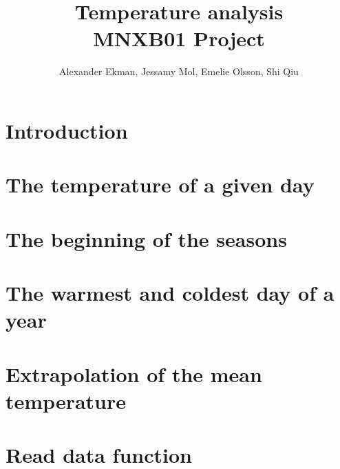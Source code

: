 \documentclass[a4paper]{article}
\title{\vspace{-12pt}
\textbf{Temperature analysis } \\ 
\vspace{5pt}
\large MNXB01 Project}
\author{Alexander Ekman, Jessamy Mol, Emelie Olsson, Shi Qiu}
\date{ }
\begin{document}
 
 
 

\maketitle

\vspace{-24pt}
\section{Introduction}
 


\section{The temperature of a given day}


\section{The beginning of the seasons}


\section{The warmest and coldest day of a year}


\section{Extrapolation of the mean temperature}


\clearpage
\newpage
\appendix 
\section{Read data function}
\label{appendix}


\newpage


 
\end{document}
